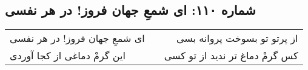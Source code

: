 \begin{center}
\section*{شماره ۱۱۰: ای شمعِ جهان فروز! در هر نفسی}
\label{sec:110}
\begin{longtable}{l p{0.5cm} r}
ای شمعِ جهان فروز! در هر نفسی
&&
از پرتو تو بسوخت پروانه بسی
\\
این گرمْ دماغی از کجا آوردی
&&
کس گرمْ دماغ تر ندید از تو کسی
\\
\end{longtable}
\end{center}
